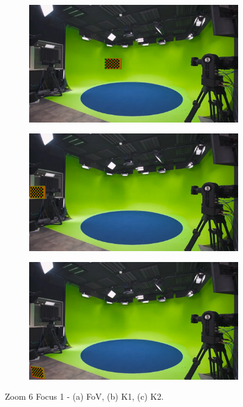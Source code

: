 \begin{figure}[h]
    \centering
    \begin{subfigure}[b]{0.45\textwidth}
        \includegraphics[width=\textwidth]{Images/08annex/results/11.2.png}
        \caption{}
        \label{fig:a2}
    \end{subfigure}
    \hfill
    \begin{subfigure}[b]{0.45\textwidth}
        \includegraphics[width=\textwidth]{Images/08annex/results/11.3.png}
        \caption{}
        \label{fig:b2}
    \end{subfigure}
    
    \vspace{0.5cm}
    
    \begin{subfigure}[b]{0.45\textwidth}
        \includegraphics[width=\textwidth]{Images/08annex/results/11.4.png}
        \caption{}
        \label{fig:c2}
    \end{subfigure}

    \caption{Zoom 6 Focus 1 - (a) FoV, (b) K1, (c) K2.}
    \label{fig:vir_fov_cal}
\end{figure}

